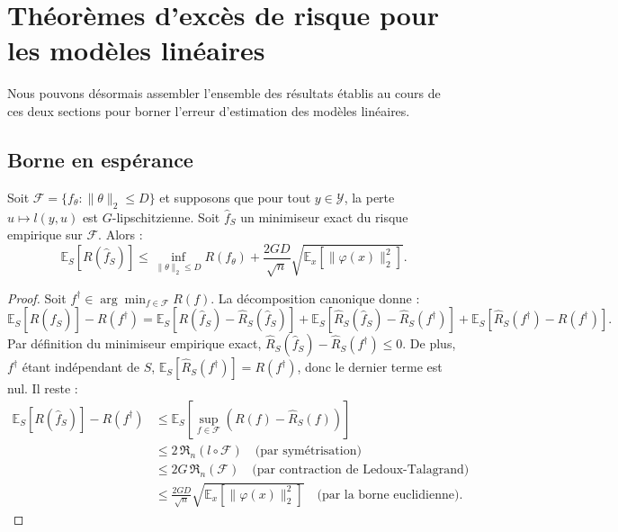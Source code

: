 
\section{Théorèmes d'excès de risque pour les modèles linéaires}

Nous pouvons désormais assembler l'ensemble des résultats établis au cours de ces deux sections pour borner l'erreur d'estimation des modèles linéaires.

\subsection{Borne en espérance}

\begin{theorem}
    Soit $\mathcal{F} = \{f_\theta : \|\theta\|_2 \leqslant D\}$ et supposons que pour tout $y \in \mathcal{Y}$, la perte $u \mapsto l(y, u)$ est $G$-lipschitzienne. Soit $\hat{f}_S$ un minimiseur exact du risque empirique sur $\mathcal{F}$. Alors :
    \begin{equation}
        \mathbb{E}_S [R(\hat{f}_S)] \leqslant \inf_{\|\theta\|_2 \leqslant D} R(f_\theta) + \frac{2GD}{\sqrt{n}} \sqrt{\mathbb{E}_x \left[ \|\varphi(x)\|_2^2 \right]}.
    \end{equation}
\end{theorem}

\begin{proof}
    Soit $f^\dagger \in \arg\min_{f \in \mathcal{F}} R(f)$. La décomposition canonique donne :
    \begin{equation*}
        \mathbb{E}_S[R(\hat{f}_S)] - R(f^\dagger) = \mathbb{E}_S[R(\hat{f}_S) - \hat{R}_S(\hat{f}_S)] + \mathbb{E}_S[\hat{R}_S(\hat{f}_S) - \hat{R}_S(f^\dagger)] + \mathbb{E}_S[\hat{R}_S(f^\dagger) - R(f^\dagger)].
    \end{equation*}
    Par définition du minimiseur empirique exact, $\hat{R}_S(\hat{f}_S) - \hat{R}_S(f^\dagger) \leqslant 0$. De plus, $f^\dagger$ étant indépendant de $S$, $\mathbb{E}_S[\hat{R}_S(f^\dagger)] = R(f^\dagger)$, donc le dernier terme est nul. Il reste :
    \begin{align*}
        \mathbb{E}_S[R(\hat{f}_S)] - R(f^\dagger) 
        &\leqslant \mathbb{E}_S \left[ \sup_{f \in \mathcal{F}} (R(f) - \hat{R}_S(f)) \right] \\
        &\leqslant 2 \, \mathfrak{R}_n(l \circ \mathcal{F}) \quad \text{(par symétrisation)} \\
        &\leqslant 2G \, \mathfrak{R}_n(\mathcal{F}) \quad \text{(par contraction de Ledoux-Talagrand)} \\
        &\leqslant \frac{2GD}{\sqrt{n}} \sqrt{\mathbb{E}_x \left[ \|\varphi(x)\|_2^2 \right]} \quad \text{(par la borne euclidienne)}.
    \end{align*}
\end{proof}

